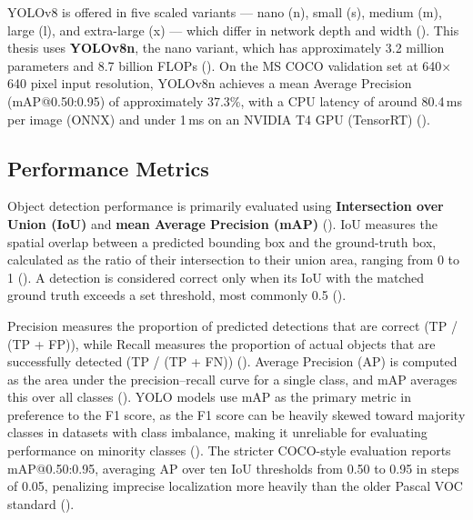\vspace{1em}

YOLOv8 is offered in five scaled variants --- nano (n), small (s), 
medium (m), large (l), and extra-large (x) --- which differ in network 
depth and width (\cite{sapkota2025ultralytics}). This thesis uses 
\textbf{YOLOv8n}, the nano variant, which has approximately 3.2 million 
parameters and 8.7 billion FLOPs (\cite{sapkota2025ultralytics}). On the 
MS COCO validation set at 640$\times$640 pixel input resolution, YOLOv8n 
achieves a mean Average Precision (mAP@0.50:0.95) of approximately 37.3\%, 
with a CPU latency of around 80.4\,ms per image (ONNX) and under 1\,ms 
on an NVIDIA T4 GPU (TensorRT) (\cite{sapkota2025ultralytics}).


\subsection{Performance Metrics}

Object detection performance is primarily evaluated using \textbf{Intersection 
over Union (IoU)} and \textbf{mean Average Precision (mAP)} 
(\cite{vijayakumar2024yolo}). IoU measures the spatial overlap between a 
predicted bounding box and the ground-truth box, calculated as the ratio 
of their intersection to their union area, ranging from 0 to 1 
(\cite{vijayakumar2024yolo}). A detection is considered correct only when 
its IoU with the matched ground truth exceeds a set threshold, most 
commonly 0.5 (\cite{vijayakumar2024yolo, sapkota2025ultralytics}).

\vspace{1em}

Precision measures the proportion of predicted detections that are 
correct (TP / (TP + FP)), while Recall measures the proportion of actual 
objects that are successfully detected (TP / (TP + FN)) 
(\cite{vijayakumar2024yolo}). Average Precision (AP) is computed as the 
area under the precision--recall curve for a single class, and mAP 
averages this over all classes (\cite{vijayakumar2024yolo}). YOLO models 
use mAP as the primary metric in preference to the F1 score, as the 
F1 score can be heavily skewed toward majority classes in datasets with 
class imbalance, making it unreliable for evaluating performance on 
minority classes (\cite{vijayakumar2024yolo}). The stricter COCO-style 
evaluation reports mAP@0.50:0.95, averaging AP over ten IoU thresholds 
from 0.50 to 0.95 in steps of 0.05, penalizing imprecise localization 
more heavily than the older Pascal VOC standard (\cite{sapkota2025ultralytics}).

